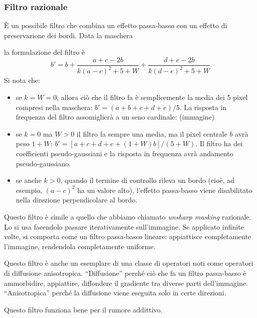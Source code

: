 \documentclass[a4paper,11pt]{article}
\begin{document}
\subsubsection{Filtro razionale}
È un possibile filtro che combina un effetto passa-basso con un effetto di preservazione dei bordi.
Data la maschera
\begin{center}
\end{center}

la formulazione del filtro è
\[
b' = b + \frac{a+c-2b}{k(a-c)^2 +5+W} + \frac{d+e-2b}{k(d-e)^2 +5+W}
\]
Si nota che:
\begin{itemize}
    \item se $k = W = 0$, allora ciò che il filtro fa è semplicemente la media dei 5 pixel compresi nella maschera: $b' = (a+b+c+d+e) / 5$. La risposta in frequenza del filtro
    assomiglierà a un seno cardinale: (immagine)
    \item se $k = 0$ ma $W > 0$ il filtro fa sempre una media, ma il pixel centrale $b$ avrà peso $1+W$: $b' = [a+c+d+e+(1+W)b] / (5+W)$. Il filtro ha dei coefficienti pseudo-gaussiani
    e la risposta in frequenza avrà andamento pseudo-gaussiano.
    \item se anche $k > 0$, quando il termine di controllo rileva un bordo (cioè, ad esempio, $(a-c)^2$ ha un valore alto), l'effetto passa-basso viene disabilitato nella direzione
    perpendicolare al bordo.
\end{itemize}
Questo filtro è simile a quello che abbiamo chiamato \textit{unsharp masking} razionale. Lo si usa facendolo passare iterativamente sull'immagine.
Se applicato infinite volte, si comporta come un filtro passa-basso lineare: appiattisce completamente l'immagine, rendendola completamente uniforme.
\par
Questo filtro è anche un esemplare di una classe di operatori noti come operatori di diffusione anisotropica. ``Diffusione'' perché ciò che fa un filtro passa-basso è
ammorbidire, appiattire, diffondere il gradiente tra diverse parti dell'immagine. ``Anisotropica'' perché la diffusione viene eseguita solo in certe direzioni.
\par
Questo filtro funziona bene per il rumore addittivo.
\end{document}
